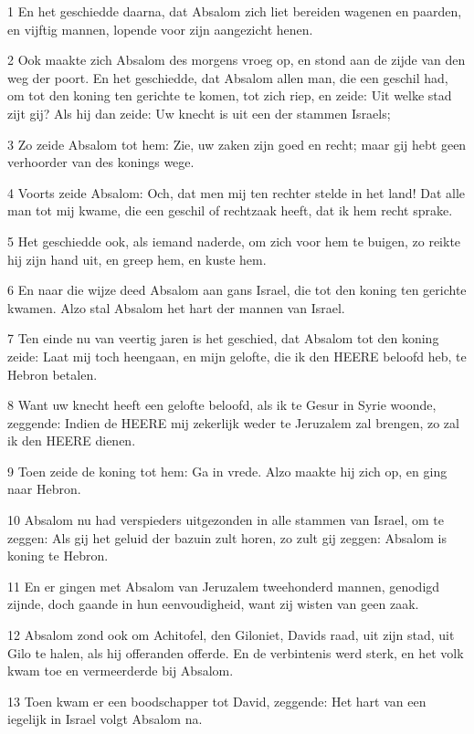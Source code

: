 \par 1 En het geschiedde daarna, dat Absalom zich liet bereiden wagenen en paarden, en vijftig mannen, lopende voor zijn aangezicht henen.
\par 2 Ook maakte zich Absalom des morgens vroeg op, en stond aan de zijde van den weg der poort. En het geschiedde, dat Absalom allen man, die een geschil had, om tot den koning ten gerichte te komen, tot zich riep, en zeide: Uit welke stad zijt gij? Als hij dan zeide: Uw knecht is uit een der stammen Israels;
\par 3 Zo zeide Absalom tot hem: Zie, uw zaken zijn goed en recht; maar gij hebt geen verhoorder van des konings wege.
\par 4 Voorts zeide Absalom: Och, dat men mij ten rechter stelde in het land! Dat alle man tot mij kwame, die een geschil of rechtzaak heeft, dat ik hem recht sprake.
\par 5 Het geschiedde ook, als iemand naderde, om zich voor hem te buigen, zo reikte hij zijn hand uit, en greep hem, en kuste hem.
\par 6 En naar die wijze deed Absalom aan gans Israel, die tot den koning ten gerichte kwamen. Alzo stal Absalom het hart der mannen van Israel.
\par 7 Ten einde nu van veertig jaren is het geschied, dat Absalom tot den koning zeide: Laat mij toch heengaan, en mijn gelofte, die ik den HEERE beloofd heb, te Hebron betalen.
\par 8 Want uw knecht heeft een gelofte beloofd, als ik te Gesur in Syrie woonde, zeggende: Indien de HEERE mij zekerlijk weder te Jeruzalem zal brengen, zo zal ik den HEERE dienen.
\par 9 Toen zeide de koning tot hem: Ga in vrede. Alzo maakte hij zich op, en ging naar Hebron.
\par 10 Absalom nu had verspieders uitgezonden in alle stammen van Israel, om te zeggen: Als gij het geluid der bazuin zult horen, zo zult gij zeggen: Absalom is koning te Hebron.
\par 11 En er gingen met Absalom van Jeruzalem tweehonderd mannen, genodigd zijnde, doch gaande in hun eenvoudigheid, want zij wisten van geen zaak.
\par 12 Absalom zond ook om Achitofel, den Giloniet, Davids raad, uit zijn stad, uit Gilo te halen, als hij offeranden offerde. En de verbintenis werd sterk, en het volk kwam toe en vermeerderde bij Absalom.
\par 13 Toen kwam er een boodschapper tot David, zeggende: Het hart van een iegelijk in Israel volgt Absalom na.
